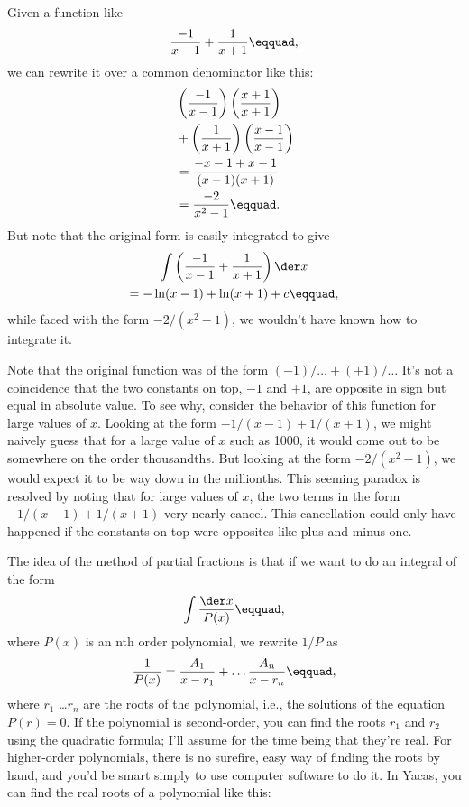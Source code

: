 Given a function like
\begin{equation*}
  \frac{-1}{x-1}+\frac{1}{x+1}\eqquad,
\end{equation*}
we can rewrite it over a common denominator like this:
\begin{align*}
  &\left(\frac{-1}{x-1}\right)\left(\frac{x+1}{x+1}\right) \\
  &+\left(\frac{1}{x+1}\right)\left(\frac{x-1}{x-1}\right) \\
  &=\frac{-x-1+x-1}{(x-1)(x+1)} \\
  &=\frac{-2}{x^2-1}\eqquad.
\end{align*}
But note that the original form is easily integrated to give
\begin{multline*}
  \int \left(\frac{-1}{x-1}+\frac{1}{x+1}\right)\der x \\
    =-\ln(x-1)+\ln(x+1)+c\eqquad,
\end{multline*}
while faced with the form \linebreak[4] $-2/(x^2-1)$, we wouldn't have known how to
integrate it.

Note that the original function was of the form $(-1)/\ldots+(+1)/\ldots$
It's not a coincidence that the two constants on top, $-1$ and $+1$, are opposite in sign
but equal in absolute value. To see why, consider the behavior of
this function for large values of $x$. Looking at the form
$-1/(x-1)+1/(x+1)$, we might naively guess that for a large value of $x$
such as 1000, it would come out to be somewhere on the order thousandths.
But looking at the form $-2/(x^2-1)$, we would expect it to be way down in the millionths.
This seeming paradox is resolved by noting that for large values of $x$,
the two terms in the form $-1/(x-1)+1/(x+1)$ very nearly cancel. This cancellation
could only have happened if the constants on top were opposites like plus and minus one.

The idea of the method of partial fractions is that if we want to
do an integral of the form
\begin{equation*}
  \int \frac{\der x}{P(x)}\eqquad,
\end{equation*}
where $P(x)$ is an nth order polynomial, we rewrite $1/P$ as
\begin{equation*}
  \frac{1}{P(x)} = \frac{A_1}{x-r_1} + \ldots \frac{A_n}{x-r_n}\eqquad,
\end{equation*}
where $r_1$ \ldots $r_n$ are the roots of the polynomial, i.e., the
solutions of the equation $P(r)=0$. If the polynomial is second-order,
you can find the roots $r_1$ and $r_2$ using the quadratic formula; I'll assume for
the time being that they're real.
For higher-order polynomials, there is no surefire, easy
way of finding the roots by hand, and you'd be smart simply to use computer software
to do it. In Yacas, you can find the real roots of a polynomial like this:


